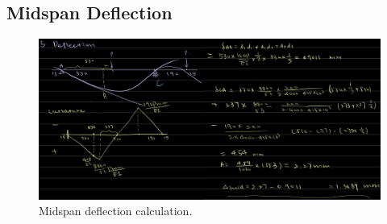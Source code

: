 \documentclass{article}
\begin{document}
\subsection{Midspan Deflection}

\begin{figure}[H]
    \centering
    \includegraphics[width=\textwidth]{deflection.png}
    \caption{Midspan deflection calculation.}
\end{figure}
\end{document}
